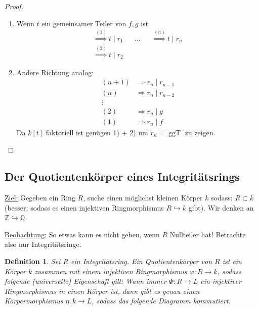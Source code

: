 \documentclass[a4paper,12pt,numbers=noenddot,parskip=full]{scrartcl}
\newcommand{\setZ}{\mathbb{Z}}
\newcommand{\setQ}{\mathbb{Q}}
\newcommand{\heading}{\underline}
\theoremstyle{dotless}
\newtheorem{definition}[theorem]{Definition}
\theoremstyle{remark}
\begin{document}
	\begin{proof}
		\begin{enumerate}
			\item Wenn $t$ ein gemeinsamer Teiler von $f,g$ ist
			\begin{align*}
				\overset{(1)}{\Longrightarrow} t \mid r_1 && \dots && \overset{(n)}{\Longrightarrow} t \mid r_n \\
				\overset{(2)}{\Longrightarrow} t \mid r_2
			\end{align*}
			\item Andere Richtung analog:
			\begin{align*}
				(n+1) &\Longrightarrow r_n \mid r_{n-1} \\
				(n) &\Longrightarrow r_n \mid r_{n-2} \\
				\vdots \\
				(2) &\Longrightarrow r_n \mid g \\
				(1) &\Longrightarrow r_n \mid f
			\end{align*}
			Da $k[t]$ faktoriell ist genügen 1) + 2) um $r_n = \operatorname{ggT}$ zu zeigen.
		\end{enumerate}
	\end{proof}

	\subsection{Der Quotientenkörper eines Integritätsrings}
	
	\heading{Ziel:} Gegeben ein Ring $R$, suche einen möglichst kleinen Körper $k$ sodass: $R \subset k$ (besser: sodass es einen injektiven Ringmorphismus $R \hookrightarrow k$ gibt). Wir denken an $\setZ \hookrightarrow \setQ$.
	
	\heading{Beobachtung:} So etwas kann es nicht geben, wenn $R$ Nullteiler hat! Betrachte also nur Integritätsringe.
	
	\begin{definition}
		Sei $R$ ein Integritätsring. Ein \emph{Quotientenkörper von $R$} ist ein Körper $k$ zusammen mit einem injektiven Ringmorphismus $\varphi: R \to k$, sodass folgende (universelle) Eigenschaft gilt: Wann immer $\Phi: R \to L$ ein injektiver Ringmorphismus in einen Körper ist, dann gibt es genau einen Körpermorphismus $\eta: k \to L$, sodass das folgende Diagramm kommutiert.
		\begin{center}
		\end{center}
	\end{definition}
\end{document}
